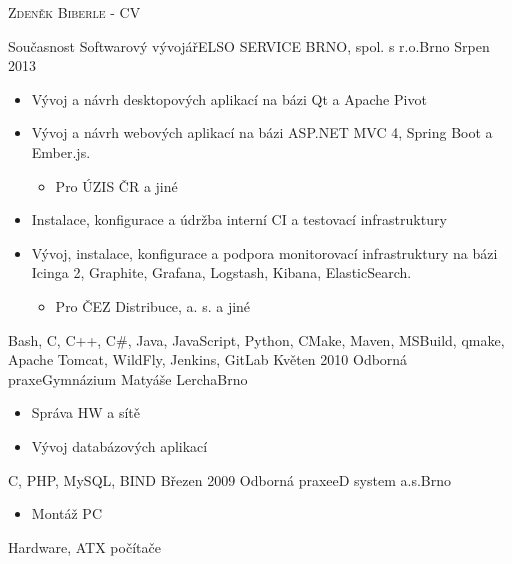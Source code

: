 \documentclass[localFont,alternative]{yaac-another-awesome-cv}
\begin{document}
	\makecvheader

	\makecvfooter
		{\textsc{}}
		{\textsc{Zdeněk Biberle - CV}}
		{\thepage}

	\begin{experiences}
		\experience
			{Současnost}
			{Softwarový vývojář}{ELSO SERVICE BRNO, spol. s r.o.}{Brno}
			{Srpen 2013}
			{
				\begin{itemize}
				\item Vývoj a návrh desktopových aplikací na bázi Qt a Apache Pivot
				\item Vývoj a návrh webových aplikací na bázi ASP.NET MVC 4, Spring Boot a Ember.js.
					\begin{itemize}
						\item Pro ÚZIS ČR a jiné
					\end{itemize}
				\item Instalace, konfigurace a údržba interní CI a testovací infrastruktury
				\item Vývoj, instalace, konfigurace a podpora monitorovací infrastruktury na bázi Icinga 2, Graphite, Grafana, Logstash, Kibana, ElasticSearch.
					\begin{itemize}
						\item Pro ČEZ Distribuce, a. s. a jiné
					\end{itemize}
				\end{itemize}
			}
			{Bash, C, C++, C\#, Java, JavaScript, Python, CMake, Maven, MSBuild, qmake, Apache Tomcat, WildFly, Jenkins, GitLab}
		\emptySeparator
		\experience
			{Květen 2010}
			{Odborná praxe}{Gymnázium Matyáše Lercha}{Brno}
			{}
			{
				\begin{itemize}
					\item Správa HW a sítě
					\item Vývoj databázových aplikací
				\end{itemize}
			}
			{C, PHP, MySQL, BIND}
		\emptySeparator
		\experience
			{Březen 2009}
			{Odborná praxe}{eD system a.s.}{Brno}
			{}
			{
				\begin{itemize}
					\item Montáž PC
				\end{itemize}
			}
			{Hardware, ATX počítače}
		\emptySeparator
	\end{experiences}

	\begin{keywords}
	\end{keywords}
	
\end{document}
